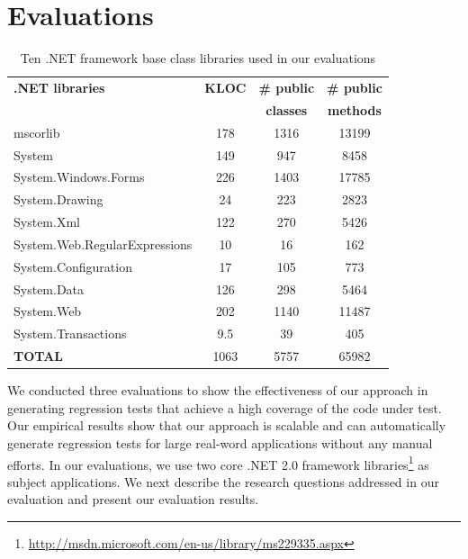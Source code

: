\section{Evaluations}
\label{sec:eval}

\setlength{\tabcolsep}{1pt}
\begin{table}[t]
\begin{SmallOut}
\begin{CodeOut}
\begin{center}
\begin {tabular} {|l|c|c|c|}
\hline
\textbf{.NET libraries} & \textbf{KLOC} & \textbf{\# public} & \textbf{\# public}\\ 
 & & \textbf{classes} & \textbf{methods}\\ 
\hline
\hline  mscorlib 											& 178 & 1316 & 13199 		\\
\hline  System 												& 149 & 947  & 8458			\\
\hline  System.Windows.Forms 					& 226	& 1403 & 17785		\\
\hline  System.Drawing 								& 24	& 223  & 2823 		\\
\hline  System.Xml 										& 122 & 270  & 5426			\\
\hline  System.Web.RegularExpressions & 10  & 16   & 162  		\\
\hline  System.Configuration 					& 17	& 105	 & 773			\\
\hline  System.Data 									& 126 & 298  & 5464 		\\
\hline  System.Web 										& 202 & 1140 & 11487		\\
\hline  System.Transactions 					& 9.5	& 39	 & 405			\\
\hline \textbf{TOTAL} 								& 1063& 5757 & 65982	  \\
\hline
\end{tabular}
\end{center}
\end{CodeOut}
\end{SmallOut}\vspace*{-4ex}
\centering \caption {\label{tab:subjects}Ten .NET framework base class libraries used in our evaluations}
\end{table}

We conducted three evaluations to show the effectiveness of our approach in generating regression tests that achieve a high coverage of the code under test. Our empirical results show that our approach is scalable and can automatically generate regression tests for large real-word applications without any manual efforts. In our evaluations,  we use two core .NET 2.0 framework libraries\footnote{\url{http://msdn.microsoft.com/en-us/library/ms229335.aspx}} as subject applications. We next describe the research questions addressed in our evaluation and present our evaluation results.

